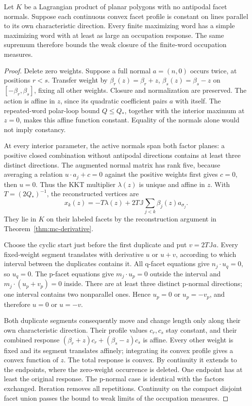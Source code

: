 \begin{lemma}\label{lem:ha-repeat}
Let $K$ be a Lagrangian product of planar polygons with no antipodal facet
normals. Suppose each continuous convex facet profile is constant on lines
parallel to its own characteristic direction. Every finite maximizing word
has a simple maximizing word with at least as large an occupation response.
The same supremum therefore bounds the weak closure of the finite-word
occupation measures.
\end{lemma}

\begin{proof}
Delete zero weights. Suppose a full normal $a=(n,0)$ occurs twice, at
positions $r<s$. Transfer weight by
$\beta_r(z)=\beta_r+z$, $\beta_s(z)=\beta_s-z$ on
$[-\beta_r,\beta_s]$, fixing all other weights. Closure and normalization
are preserved. The action is affine in $z$, since its quadratic coefficient
pairs $a$ with itself. The repeated-word polar-loop bound $Q\leq Q_*$,
together with the interior maximum at $z=0$, makes this affine function
constant. Equality of the normals alone would not imply constancy.

At every interior parameter, the active normals span both factor planes:
a positive closed combination without antipodal directions contains at least
three distinct directions. The augmented normal matrix has rank five,
because averaging a relation $u\cdot a_j+c=0$ against the positive weights
first gives $c=0$, then $u=0$. Thus the KKT multiplier $\lambda(z)$ is unique
and affine in $z$. With $T=(2Q_*)^{-1}$, the reconstructed vertices are
\[
 x_k(z)=-T\lambda(z)+2T\mathbb{J}\sum_{j<k}\beta_j(z)a_{\sigma_j}.
\]
They lie in $K$ on their labeled facets by the reconstruction argument in
Theorem~\ref{thm:mc-derivative}.

Choose the cyclic start just before the first duplicate and put $v=2T\mathbb{J}a$.
Every fixed-weight segment translates with derivative $u$ or $u+v$,
according to which interval between the duplicates contains it. All
q-facet equations give $n_j\cdot u_q=0$, so $u_q=0$. The p-facet equations
give $m_j\cdot u_p=0$ outside the interval and
$m_j\cdot(u_p+v_p)=0$ inside. There are at least three distinct p-normal
directions; one interval contains two nonparallel ones. Hence $u_p=0$ or
$u_p=-v_p$, and therefore $u=0$ or $u=-v$.

Both duplicate segments consequently move and change length only along
their own characteristic direction. Their profile values $c_r,c_s$ stay
constant, and their combined response
$(\beta_r+z)c_r+(\beta_s-z)c_s$ is affine. Every other weight is fixed and
its segment translates affinely; integrating its convex profile gives a
convex function of $z$. The total response is convex. By continuity it
extends to the endpoints, where the zero-weight occurrence is deleted.
One endpoint has at least the original response. The p-normal case is
identical with the factors exchanged. Iteration removes all repetitions.
Continuity on the compact disjoint facet union passes the bound to weak
limits of the occupation measures.
\end{proof}

